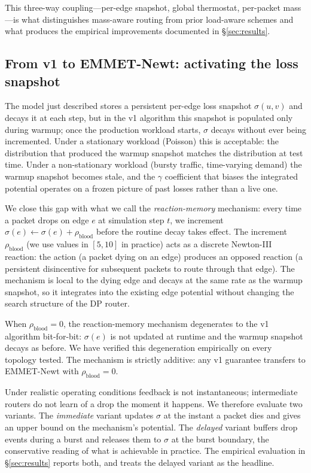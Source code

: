 This three-way coupling---per-edge snapshot, global thermostat,
per-packet mass---is what distinguishes mass-aware routing from
prior load-aware schemes and what produces the empirical
improvements documented in \S\ref{sec:results}.

\subsection{From v1 to EMMET-Newt: activating the loss snapshot}
\label{subsec:newt-extension}

The model just described stores a persistent per-edge loss snapshot
$\sigma(u,v)$ and decays it at each step, but in the v1 algorithm
this snapshot is populated only during warmup; once the production
workload starts, $\sigma$ decays without ever being incremented.
Under a stationary workload (Poisson) this is acceptable: the
distribution that produced the warmup snapshot matches the
distribution at test time. Under a non-stationary workload (bursty
traffic, time-varying demand) the warmup snapshot becomes stale,
and the $\gamma$ coefficient that biases the integrated potential
operates on a frozen picture of past losses rather than a live one.

We close this gap with what we call the \emph{reaction-memory}
mechanism: every time a packet drops on edge $e$ at simulation
step $t$, we increment $\sigma(e) \leftarrow \sigma(e) +
\rho_{\mathrm{blood}}$ before the routine decay takes effect.
The increment $\rho_{\mathrm{blood}}$ (we use values in $[5, 10]$
in practice) acts as a discrete Newton-III reaction: the action (a
packet dying on an edge) produces an opposed reaction (a persistent
disincentive for subsequent packets to route through that edge).
The mechanism is local to the dying edge and decays at the same
rate as the warmup snapshot, so it integrates into the existing
edge potential without changing the search structure of the DP
router.

When $\rho_{\mathrm{blood}} = 0$, the reaction-memory mechanism
degenerates to the v1 algorithm bit-for-bit: $\sigma(e)$ is not
updated at runtime and the warmup snapshot decays as before.
We have verified this degeneration empirically on every topology
tested. The mechanism is strictly additive: any v1 guarantee
transfers to EMMET-Newt with $\rho_{\mathrm{blood}} = 0$.

Under realistic operating conditions feedback is not instantaneous;
intermediate routers do not learn of a drop the moment it happens.
We therefore evaluate two variants. The \emph{immediate} variant
updates $\sigma$ at the instant a packet dies and gives an upper
bound on the mechanism's potential. The \emph{delayed} variant
buffers drop events during a burst and releases them to $\sigma$ at
the burst boundary, the conservative reading of what is achievable
in practice. The empirical evaluation in \S\ref{sec:results}
reports both, and treats the delayed variant as the headline.

